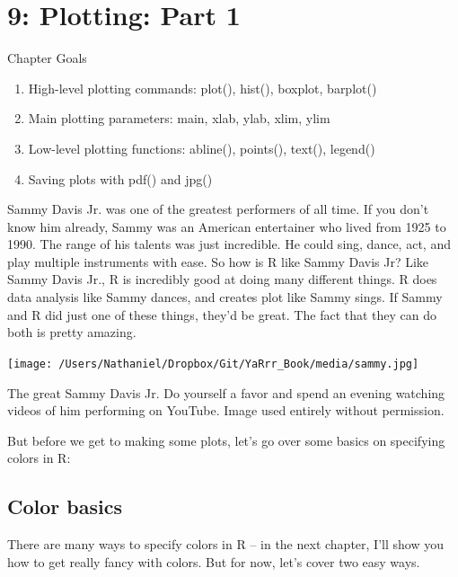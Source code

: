 \documentclass{tufte-book}\usepackage[]{graphicx}\usepackage[]{color}
\begin{document}

\chapter{9: Plotting: Part 1}
\label{ch:9}

Chapter Goals

\begin{enumerate}
  \item High-level plotting commands: plot(), hist(), boxplot, barplot()
  \item Main plotting parameters: main, xlab, ylab, xlim, ylim
  \item Low-level plotting functions: abline(), points(), text(), legend()
  \item Saving plots with pdf() and jpg()
\end{enumerate}

Sammy Davis Jr. was one of the greatest performers of all time. If you don't know him already, Sammy was an American entertainer who lived from 1925 to 1990. The range of his talents was just incredible. He could sing, dance, act, and play multiple instruments with ease. So how is R like Sammy Davis Jr? Like Sammy Davis Jr., R is incredibly good at doing many different things. R does data analysis like Sammy dances, and creates plot like Sammy sings. If Sammy and R did just one of these things, they'd be great. The fact that they can do both is pretty amazing.

\begin{marginfigure}
\texttt{[image: /Users/Nathaniel/Dropbox/Git/YaRrr\_Book/media/sammy.jpg]}
\caption{The great Sammy Davis Jr. Do yourself a favor and spend an evening watching videos of him performing on YouTube. Image used entirely without permission.}
\label{fig:sammy}
\end{marginfigure}

But before we get to making some plots, let's go over some basics on specifying colors in R:

\section{Color basics}

There are many ways to specify colors in R -- in the next chapter, I'll show you how to get really fancy with colors. But for now, let's cover two easy ways.
\end{document}
